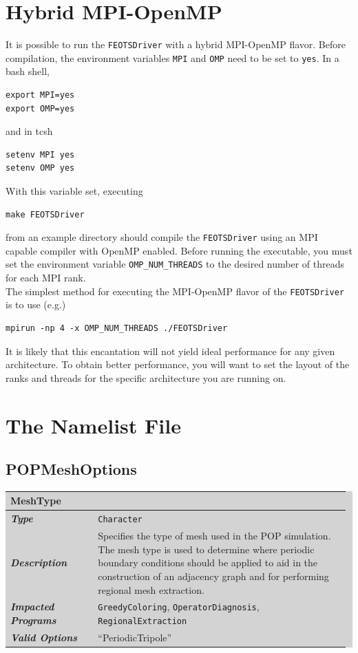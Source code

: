 \documentclass{softwaremanual}
\begin{document}
\section{Hybrid MPI-OpenMP}
It is possible to run the \texttt{FEOTSDriver} with a hybrid MPI-OpenMP flavor. Before compilation, the environment variables \texttt{MPI} and \texttt{OMP} need to be set to \texttt{yes}. In a bash shell,
\begin{verbatim}
export MPI=yes
export OMP=yes
\end{verbatim} 
and in tcsh
\begin{verbatim}
setenv MPI yes
setenv OMP yes
\end{verbatim}
With this variable set, executing
\begin{verbatim}
make FEOTSDriver
\end{verbatim}
from an example directory should compile the \texttt{FEOTSDriver} using an MPI capable compiler with OpenMP enabled. Before running the executable, you must set the environment variable \texttt{OMP\_NUM\_THREADS} to the desired number of threads for each MPI rank.\\

The simplest method for executing the MPI-OpenMP flavor of the \texttt{FEOTSDriver} is to use (e.g.)
\begin{verbatim}
mpirun -np 4 -x OMP_NUM_THREADS ./FEOTSDriver
\end{verbatim}
It is likely that this encantation will not yield ideal performance for any given architecture. To obtain better performance, you will want to set the layout of the ranks and threads for the specific architecture you are running on.


\section{The Namelist File}

\subsection{POPMeshOptions} \label{sec:POPMeshOptions}

\begingroup\setlength{\fboxsep}{0pt}
  \colorbox{lightgray}{
    \begin{tabular}{p{0.25\linewidth} p{0.725\linewidth}}
    \toprule
    \textbf{MeshType} & \\
    \midrule
    \textbf{\textit{Type}} & \texttt{Character} \\
    \midrule
    \textbf{\textit{Description}} & Specifies the type of mesh used in the POP simulation. The mesh type is used to determine where periodic boundary conditions should be applied to aid in the construction of an adjacency graph and for performing regional mesh extraction. \\
    \midrule
    \textbf{\textit{Impacted Programs}} & \texttt{GreedyColoring}, \texttt{OperatorDiagnosis}, \texttt{RegionalExtraction} \\
    \midrule
    \textbf{\textit{Valid Options}}  & ``PeriodicTripole'' \\
    \bottomrule
\end{tabular}
}\endgroup
\end{document}
